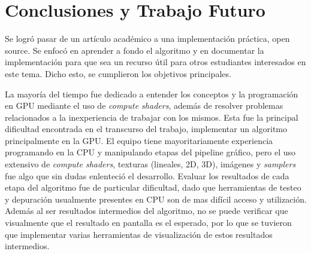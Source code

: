 \graphicspath{{chapters/6_conclusión/figures/}}



\chapter{Conclusiones y Trabajo Futuro}\label{chap:conclusions}

Se logró pasar de un artículo académico a una implementación práctica, open source.
Se enfocó en aprender a fondo el algoritmo y en documentar la implementación para que sea un recurso útil para otros estudiantes interesados en este tema.
Dicho esto, se cumplieron los objetivos principales.

La mayoría del tiempo fue dedicado a entender los conceptos y la programación en GPU mediante el uso de \textit{compute shaders}, además de resolver problemas relacionados a la inexperiencia de trabajar con los mismos.
Esta fue la principal dificultad encontrada en el transcurso del trabajo, implementar un algoritmo principalmente en la GPU.
El equipo tiene mayoritariamente experiencia programando en la CPU y manipulando etapas del pipeline gráfico, pero el uso extensivo de \textit{compute shaders}, texturas (lineales, 2D, 3D), imágenes y \textit{samplers} fue algo que sin dudas enlenteció el desarrollo.
Evaluar los resultados de cada etapa del algoritmo fue de particular dificultad, dado que herramientas de testeo y depuración usualmente presentes en CPU son de mas difícil acceso y utilización.
Además al ser resultados intermedios del algoritmo, no se puede verificar que visualmente que el resultado en pantalla es el esperado, por lo que se tuvieron que implementar varias herramientas de visualización de estos resultados intermedios.

